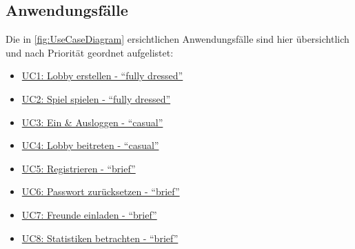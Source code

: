 \documentclass[11pt,ngerman]{article}
\newcommand{\quotes}[1]{``#1''}
\begin{document}
    \subsection{Anwendungsfälle}
    Die in \autoref{fig:UseCaseDiagram} ersichtlichen Anwendungsfälle sind hier übersichtlich und nach Priorität geordnet aufgelistet:
    \begin{multicols}{2}
    	\begin{itemize}
    		\item  \hyperref[ssec:UC1Lobbyerstellen]{UC1: Lobby erstellen - \quotes{fully dressed}}
    		\item\hyperref[ssec:UC2Spielspielen]{UC2: Spiel spielen - \quotes{fully dressed}}
    		\item \hyperref[sssec:UC3EinAusloggen]{UC3: Ein \& Ausloggen  - \quotes{casual}}
    		\item \hyperref[sssec:UC4Lobbybeitreten]{UC4: Lobby beitreten - \quotes{casual}}
    		\item \hyperref[sssec:UC5Registrieren]{UC5: Registrieren - \quotes{brief}}
    		\item \hyperref[sssec:UC6Passwortsetzen]{UC6: Passwort zurücksetzen - \quotes{brief}}
    		\item  \hyperref[sssec:UC7Freundeeinladen]{UC7: Freunde einladen - \quotes{brief}}
    		\item \hyperref[sssec:UC8Statistikenbetrachten]{UC8: Statistiken betrachten - \quotes{brief}}
    	\end{itemize}
    \end{multicols}
\end{document}

